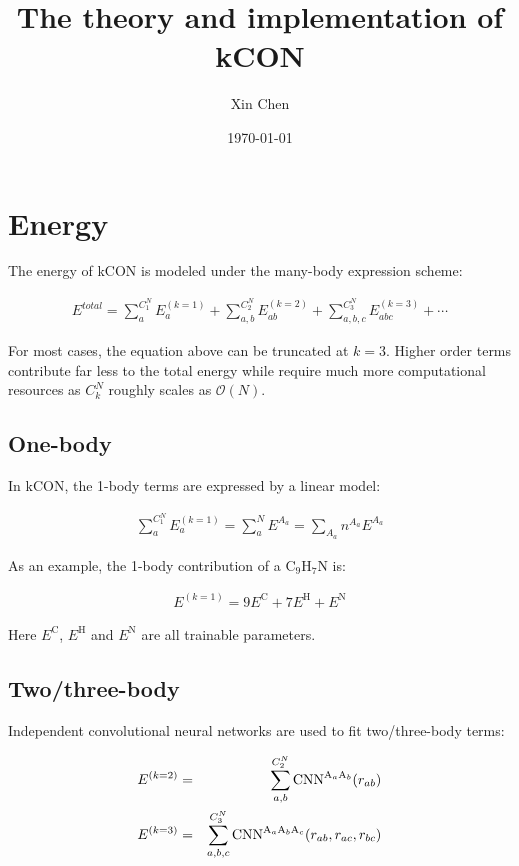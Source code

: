 \documentclass{article}
\title{The theory and implementation of kCON}
\author{Xin Chen}
\date{\today}
\begin{document}
\maketitle
	

\section{Energy}

The energy of kCON is modeled under the many-body expression scheme:

\begin{eqnarray}
E^{total} = \sum_{a}^{C^N_1}{E^{(k=1)}_{a}} + \sum_{a,b}^{C^{N}_2}{E^{(k=2)}_{ab}} 
+ \sum_{a,b,c}^{C^{N}_3}{E^{(k=3)}_{abc}} + \cdots
\end{eqnarray}

\noindent For most cases, the equation above can be truncated at $k = 3$. Higher order 
terms contribute far less to the total energy while require much more computational
resources as $C^N_k$ roughly scales as $\mathcal{O}(N)$.

\subsection{One-body}

In kCON, the 1-body terms are expressed by a linear model:

\begin{eqnarray}
\sum_{a}^{C^N_1}{E^{(k=1)}_{a}} = \sum_{a}^{N}{E^{A_a}} = \sum_{A_{a}}{n^{A_a}E^{A_a}}
\end{eqnarray}

\noindent As an example, the 1-body contribution of a 
$\mathrm{C}_9 \mathrm{H}_7 \mathrm{N}$ is:

\begin{eqnarray}
E^{(k=1)} = 9E^{\mathrm{C}} + 7E^{\mathrm{H}} + E^{\mathrm{N}}
\end{eqnarray}

\noindent Here $E^{\mathrm{C}}$, $E^{\mathrm{H}}$ and $E^{\mathrm{N}}$ are all
trainable parameters.

\subsection{Two/three-body}

Independent convolutional neural networks are used to fit two/three-body terms:

\begin{eqnarray}
E^{(k=2)} & = & \sum_{a,b}^{C^N_2}{
	\boldmath{\mathrm{CNN}}^{\mathrm{A}_{a}\mathrm{A}_{b}}
}(r_{ab}) \\
E^{(k=3)} & = & \sum_{a,b,c}^{C^N_3}{
	\boldmath{\mathrm{CNN}}^{\mathrm{A}_{a}\mathrm{A}_{b}\mathrm{A}_{c}}
}(r_{ab}, r_{ac}, r_{bc})
\end{eqnarray}
\end{document}
